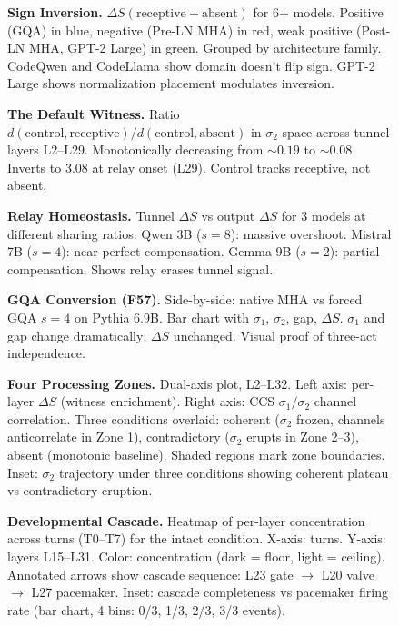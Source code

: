 \documentclass[12pt]{article}
\begin{document}
\begin{figure}[h]
\caption{\textbf{Sign Inversion.} $\Delta S(\text{receptive}-\text{absent})$ for 6+ models. Positive (GQA) in blue, negative (Pre-LN MHA) in red, weak positive (Post-LN MHA, GPT-2 Large) in green. Grouped by architecture family. CodeQwen and CodeLlama show domain doesn't flip sign. GPT-2 Large shows normalization placement modulates inversion.}
\end{figure}

\begin{figure}[h]
\caption{\textbf{The Default Witness.} Ratio $d(\text{control},\text{receptive})/d(\text{control},\text{absent})$ in $\sigma_2$ space across tunnel layers L2--L29. Monotonically decreasing from ${\sim}0.19$ to ${\sim}0.08$. Inverts to 3.08 at relay onset (L29). Control tracks receptive, not absent.}
\end{figure}

\begin{figure}[h]
\caption{\textbf{Relay Homeostasis.} Tunnel $\Delta S$ vs output $\Delta S$ for 3 models at different sharing ratios. Qwen 3B ($s=8$): massive overshoot. Mistral 7B ($s=4$): near-perfect compensation. Gemma 9B ($s=2$): partial compensation. Shows relay erases tunnel signal.}
\end{figure}

\begin{figure}[h]
\caption{\textbf{GQA Conversion (F57).} Side-by-side: native MHA vs forced GQA $s=4$ on Pythia 6.9B. Bar chart with $\sigma_1$, $\sigma_2$, gap, $\Delta S$. $\sigma_1$ and gap change dramatically; $\Delta S$ unchanged. Visual proof of three-act independence.}
\end{figure}

\begin{figure}[h]
\caption{\textbf{Four Processing Zones.} Dual-axis plot, L2--L32. Left axis: per-layer $\Delta S$ (witness enrichment). Right axis: CCS $\sigma_1/\sigma_2$ channel correlation. Three conditions overlaid: coherent ($\sigma_2$ frozen, channels anticorrelate in Zone 1), contradictory ($\sigma_2$ erupts in Zone 2--3), absent (monotonic baseline). Shaded regions mark zone boundaries. Inset: $\sigma_2$ trajectory under three conditions showing coherent plateau vs contradictory eruption.}
\end{figure}

\begin{figure}[h]
\caption{\textbf{Developmental Cascade.} Heatmap of per-layer concentration across turns (T0--T7) for the intact condition. X-axis: turns. Y-axis: layers L15--L31. Color: concentration (dark = floor, light = ceiling). Annotated arrows show cascade sequence: L23 gate $\to$ L20 valve $\to$ L27 pacemaker. Inset: cascade completeness vs pacemaker firing rate (bar chart, 4 bins: 0/3, 1/3, 2/3, 3/3 events).}
\end{figure}
\end{document}
